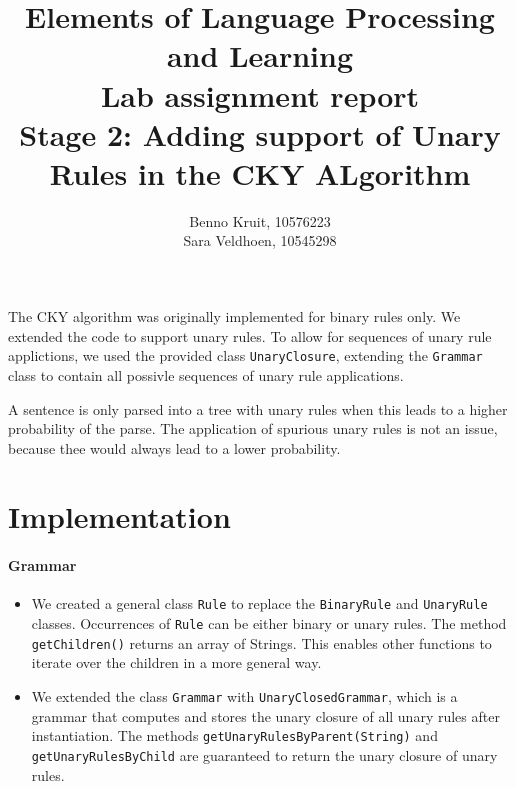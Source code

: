 \documentclass{article}
\title{Elements of Language Processing and Learning\\
Lab assignment report\\
Stage 2: Adding support of Unary Rules in the CKY ALgorithm}
\author{Benno Kruit, 10576223\\Sara Veldhoen, 10545298}
\begin{document}
\maketitle

The CKY algorithm was originally implemented for binary rules only. We extended the code to support unary rules. To allow for sequences of unary rule applictions, we used the provided class {\tt UnaryClosure}, extending the {\tt Grammar} class to contain all possivle sequences of unary rule applications.

A sentence is only parsed into a tree with unary rules when this leads to a higher probability of the parse. The application of spurious unary rules is not an issue, because thee would always lead to a lower probability.
 
\section{Implementation}
\paragraph{Grammar}
\begin{itemize}
\item We created a general class {\tt Rule} to replace the {\tt BinaryRule} and {\tt UnaryRule} classes. Occurrences of {\tt Rule} can be either binary or unary rules. The method {\tt getChildren()} returns an array of Strings. This enables other functions to iterate over the children in a more general way.

\item We extended the class {\tt Grammar} with {\tt UnaryClosedGrammar}, which is a grammar that computes and stores the unary closure of all unary rules after instantiation. The methods {\tt getUnaryRulesByParent(String)} and {\tt getUnaryRulesByChild} are guaranteed to return the unary closure of unary rules.

\end{itemize}
\end{document}
